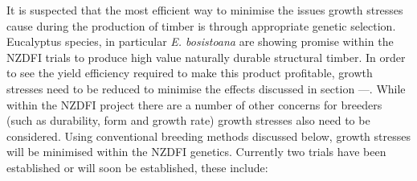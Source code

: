 It is suspected that the most efficient way to minimise the issues growth
stresses cause during the production of timber is through appropriate genetic
selection. Eucalyptus species, in particular \textit{E. bosistoana} are showing
promise within the NZDFI trials to produce high value naturally durable
structural timber. In order to see the yield efficiency required to make this
product profitable, growth stresses need to be reduced to minimise the effects
discussed in section ---. While within the NZDFI project there are a number of
other concerns for breeders (such as durability, form and growth rate) growth
stresses also need to be considered. Using conventional breeding methods
discussed below, growth stresses will be minimised within the NZDFI genetics.
Currently two trials have been established or will soon be established, these
include: